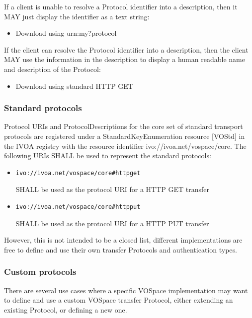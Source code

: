 \documentclass[11pt,a4paper]{ivoa}
\begin{document}
If a client is unable to resolve a Protocol identifier into a description, then it MAY just display the identifier as a text string:

\begin{itemize}
    \item Download using urn:my?protocol
\end{itemize}

If the client can resolve the Protocol identifier into a description, then the client MAY use the information in the description to display a human readable name and description of the Protocol:

\begin{itemize}
    \item Download using standard HTTP GET
\end{itemize}

\subsubsection{Standard protocols}
\label{subsubsec:standard protocols}
Protocol URIs and ProtocolDescriptions for the core set of standard transport protocols are registered under a StandardKeyEnumeration resource [VOStd] in the IVOA registry with the resource identifier ivo://ivoa.net/vospace/core. The following URIs SHALL be used to represent the standard protocols:

\begin{itemize}
    \item \begin{verbatim}ivo://ivoa.net/vospace/core#httpget\end{verbatim} SHALL be used as the protocol URI for a HTTP GET transfer
    \item \begin{verbatim}ivo://ivoa.net/vospace/core#httpput\end{verbatim} SHALL be used as the protocol URI for a HTTP PUT transfer
\end{itemize}

However, this is not intended to be a closed list, different implementations are free to define and use their own transfer Protocols and authentication types.

\subsubsection{Custom protocols}
\label{subsubsec:custom protocols}
There are several use cases where a specific VOSpace implementation may want to define and use a custom VOSpace transfer Protocol, either extending an existing Protocol, or defining a new one.
\end{document}
